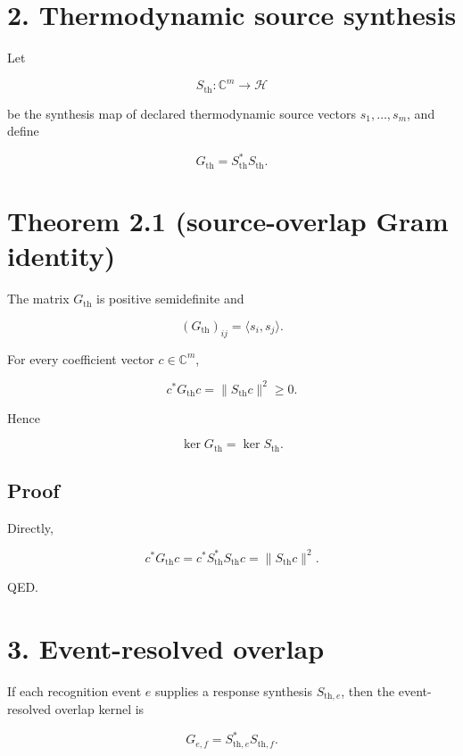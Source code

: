 \hypertarget{thermodynamic-source-synthesis}{%
\section{2. Thermodynamic source synthesis}\label{thermodynamic-source-synthesis}}

Let

\[
S_{\mathrm{th}}:\mathbb C^m\to\mathcal H
\]

be the synthesis map of declared thermodynamic source vectors \(s_1,\ldots,s_m\), and define

\[
\boxed{
G_{\mathrm{th}}=S_{\mathrm{th}}^*S_{\mathrm{th}}.
}
\]

\hypertarget{theorem-2.1-source-overlap-gram-identity}{%
\section{Theorem 2.1 (source-overlap Gram identity)}\label{theorem-2.1-source-overlap-gram-identity}}

The matrix \(G_{\mathrm{th}}\) is positive semidefinite and

\[
(G_{\mathrm{th}})_{ij}=\langle s_i,s_j\rangle.
\]

For every coefficient vector \(c\in\mathbb C^m\),

\[
\boxed{
c^*G_{\mathrm{th}}c=\|S_{\mathrm{th}}c\|^2\ge0.
}
\]

Hence

\[
\ker G_{\mathrm{th}}=\ker S_{\mathrm{th}}.
\]

\hypertarget{proof-1}{%
\subsection{Proof}\label{proof-1}}

Directly,

\[
c^*G_{\mathrm{th}}c
=c^*S_{\mathrm{th}}^*S_{\mathrm{th}}c
=\|S_{\mathrm{th}}c\|^2.
\]

QED.

\hypertarget{event-resolved-overlap}{%
\section{3. Event-resolved overlap}\label{event-resolved-overlap}}

If each recognition event \(e\) supplies a response synthesis \(S_{\mathrm{th},e}\), then the event-resolved overlap kernel is

\[
G_{e,f}=S_{\mathrm{th},e}^*S_{\mathrm{th},f}.
\]


